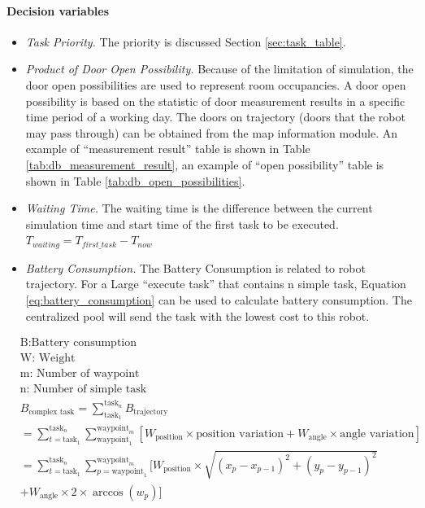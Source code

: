 \paragraph{Decision variables}
\begin{itemize}
\item \textsl{Task Priority.}  The priority is discussed Section \ref{sec:task_table}.
\item \textsl{Product of Door Open Possibility.} Because of the limitation of simulation, the door open possibilities are used to represent room occupancies. A door open possibility is based on the statistic of door measurement results in a specific time period of a working day. 
	The doors on trajectory (doors that the robot may pass through) can be obtained from the map information module.
	An example of ``measurement result'' table is shown in Table \ref{tab:db_measurement_result}, an example of ``open possibility'' table is shown in Table \ref{tab:db_open_possibilities}. 
\item \textsl{Waiting Time. } The waiting time is the difference between the current simulation time and start time of the first task to be executed. $T_{waiting} = T_{first\_task} - T_{now}$
\item \textsl{Battery Consumption.} The Battery Consumption is related to robot trajectory. For a Large ``execute task'' that contains n simple task, Equation \ref{eq:battery_consumption} can be used to calculate battery consumption. The centralized pool will send the task with the lowest cost to this robot.
\end{itemize}


\begin{equation}
\begin{aligned}
\label{eq:battery_consumption}
& \mbox{B:Battery consumption } \\
& \mbox{W: Weight } \\
& \mbox{m: Number of waypoint } \\
& \mbox{n: Number of simple task} \\
& B_{\mbox{complex task}} = \sum_{\mbox{task}_1}^{\mbox{task}_n} B_{\mbox{trajectory}} \\
& = \sum_{t = \mbox{task}_1}^{\mbox{task}_n} \sum_{\mbox{waypoint}_1}^{\mbox{waypoint}_m} [W_{\mbox{position}} \times \mbox{position variation}+W_{\mbox{angle}}  \times \mbox{angle variation}]\\
& = \sum_{t = \mbox{task}_1}^{\mbox{task}_n} \sum_{p = \mbox{waypoint}_1}^{\mbox{waypoint}_m} [ W_{\mbox{position}} \times \sqrt{(x_p-x_{p-1} )^2+(y_p-y_{p-1} )^2} \\
&   + W_{\mbox{angle}} \times 2 \times \arccos(w_p)] 
\end{aligned}
\end{equation}



